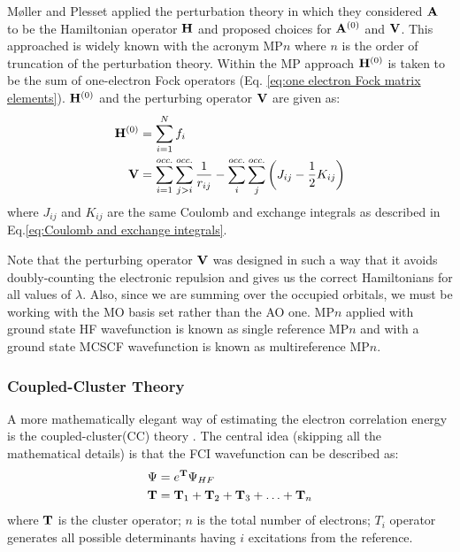                 M\o{}ller and Plesset \cite{Moller1934} applied the perturbation theory in which they considered ${\mathbf {A}}$ to be the Hamiltonian operator ${\mathbf {H}}$ and proposed choices for ${\mathbf {A}}^{(0)}$ and ${\mathbf {V}}$. This approached is widely known with the acronym MP$n$ where $n$ is the order of truncation of the perturbation theory. Within the MP approach ${\mathbf {H}}^{(0)}$ is taken to be the sum of one-electron Fock operators (Eq. \eqref{eq:one electron Fock matrix elements}). ${\mathbf {H}}^{(0)}$ and the perturbing operator ${\mathbf {V}}$ are given as:
                \begin{equation}\label{eq:MP elements}
                    \begin{aligned}
                        {\mathbf {H}}^{(0)} &= \displaystyle\sum_{i=1}^N f_i\\
                        {\mathbf {V}} &= \displaystyle\sum_{i=1}^{occ.} \displaystyle\sum_{j > i}^{occ.} \frac{1}{r_{ij}} - \displaystyle\sum_{i}^{occ.} \displaystyle\sum_{j}^{occ.} \left (J_{ij} - \frac{1}{2} K_{ij} \right)
                    \end{aligned}
                \end{equation}
                where $J_{ij}$ and $K_{ij}$ are the same Coulomb and exchange integrals as described in Eq.\eqref{eq:Coulomb and exchange integrals}.

                Note that the perturbing operator ${\mathbf {V}}$ was designed in such a way that it avoids doubly-counting the electronic repulsion and gives us the correct Hamiltonians for all values of $\lambda$. Also, since we are summing over the occupied orbitals, we must be working with the MO basis set rather than the AO one. MP$n$ applied with ground state HF wavefunction is known as single reference MP$n$ and with a ground state MCSCF wavefunction is known as multireference MP$n$.

            \subsubsection{Coupled-Cluster Theory}\label{subsubsec:coupled-cluster theory}
                A more mathematically elegant way of estimating the electron correlation energy is the coupled-cluster(CC) theory \cite{Cizek1966}. The central idea (skipping all the mathematical details) is that the FCI wavefunction can be described as:
                \begin{equation}\label{eq:cc}
                    \begin{aligned}
                        \Psi &= e^{\mathbf {T}} \Psi_{HF}\\
                        {\mathbf {T}} &= {\mathbf {T}}_1 + {\mathbf {T}}_2 + {\mathbf {T}}_3 + \ldots + {\mathbf {T}}_n
                    \end{aligned}
                \end{equation}
                where ${\mathbf {T}}$ is the cluster operator; $n$ is the total number of electrons; $T_i$ operator generates all possible determinants having $i$ excitations from the reference.

